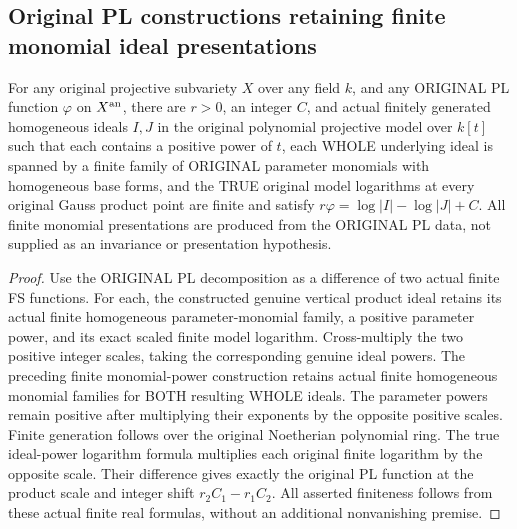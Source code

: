 \subsection{Original PL constructions retaining finite monomial ideal presentations}

\begin{theorem}
\label{local:actual-pl-finite-monomial-models}
\leanok
{}
For any original projective subvariety $X$ over any field $k$, and any
ORIGINAL PL function $\varphi$ on $X^{\rm an}$, there are $r>0$, an integer
$C$, and actual finitely generated homogeneous ideals $I,J$ in the
original polynomial projective model over $k[t]$ such that each contains
a positive power of $t$, each WHOLE underlying ideal is spanned by a
finite family of ORIGINAL parameter monomials with homogeneous base
forms, and the TRUE original model logarithms at every original Gauss
product point are finite and satisfy
$r\varphi=\log|I|-\log|J|+C$.
All finite monomial presentations are produced from the ORIGINAL PL data,
not supplied as an invariance or presentation hypothesis.
\end{theorem}
\begin{proof}
Use the ORIGINAL PL decomposition as a difference of two actual finite
FS functions. For each, the constructed genuine vertical
product ideal retains its actual finite homogeneous parameter-monomial
family, a positive parameter power, and its exact scaled finite model
logarithm. Cross-multiply the two positive integer scales, taking the
corresponding genuine ideal powers. The preceding finite monomial-power
construction retains actual finite homogeneous monomial families for
BOTH resulting WHOLE ideals. The parameter powers remain positive after
multiplying their exponents by the opposite positive scales. Finite
generation follows over the original Noetherian polynomial ring.
The true ideal-power logarithm formula multiplies each original finite
logarithm by the opposite scale. Their difference gives exactly the
original PL function at the product scale and integer shift
$r_2C_1-r_1C_2$. All asserted finiteness follows from these actual finite
real formulas, without an additional nonvanishing premise.
\end{proof}
